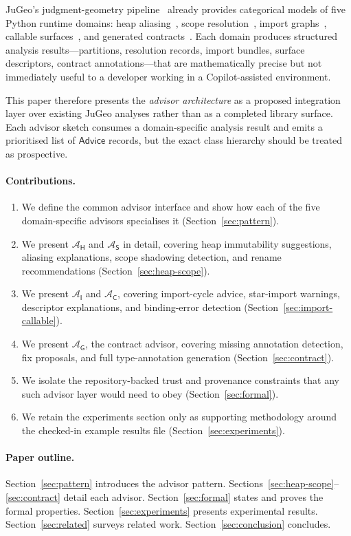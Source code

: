 \documentclass[11pt]{article}
\newcommand{\Adv}{\mathcal{A}}
\newcommand{\AdvH}{\Adv_{\mathsf{H}}}
\newcommand{\AdvS}{\Adv_{\mathsf{S}}}
\newcommand{\AdvI}{\Adv_{\mathsf{I}}}
\newcommand{\AdvC}{\Adv_{\mathsf{C}}}
\newcommand{\AdvG}{\Adv_{\mathsf{G}}}
\newcommand{\Advice}{\mathsf{Advice}}
\begin{document}
JuGeo's judgment-geometry pipeline~\cite{paper00} already provides
categorical models of five Python runtime domains: heap
aliasing~\cite{paper32}, scope resolution~\cite{paper31}, import
graphs~\cite{paper49}, callable surfaces~\cite{paper61}, and generated
contracts~\cite{paper70}.  Each domain produces structured analysis
results—partitions, resolution records, import bundles, surface
descriptors, contract annotations—that are mathematically precise but
not immediately useful to a developer working in a Copilot-assisted
environment.

This paper therefore presents the \emph{advisor architecture} as a
proposed integration layer over existing JuGeo analyses rather than as a
completed library surface.  Each advisor sketch consumes a
domain-specific analysis result and emits a prioritised list of
$\Advice$ records, but the exact class hierarchy should be treated as
prospective.

\paragraph{Contributions.}
\begin{enumerate}
  \item We define the common advisor interface and show how each of
    the five domain-specific advisors specialises it
    (Section~\ref{sec:pattern}).
  \item We present $\AdvH$ and $\AdvS$ in detail, covering heap
    immutability suggestions, aliasing explanations, scope shadowing
    detection, and rename recommendations
    (Section~\ref{sec:heap-scope}).
  \item We present $\AdvI$ and $\AdvC$, covering import-cycle advice,
    star-import warnings, descriptor explanations, and binding-error
    detection (Section~\ref{sec:import-callable}).
  \item We present $\AdvG$, the contract advisor, covering missing
    annotation detection, fix proposals, and full type-annotation
    generation (Section~\ref{sec:contract}).
  \item We isolate the repository-backed trust and provenance constraints
    that any such advisor layer would need to obey
    (Section~\ref{sec:formal}).
  \item We retain the experiments section only as supporting methodology
    around the checked-in example results file
    (Section~\ref{sec:experiments}).
\end{enumerate}

\paragraph{Paper outline.}
Section~\ref{sec:pattern} introduces the advisor pattern.
Sections~\ref{sec:heap-scope}--\ref{sec:contract} detail each advisor.
Section~\ref{sec:formal} states and proves the formal properties.
Section~\ref{sec:experiments} presents experimental results.
Section~\ref{sec:related} surveys related work.
Section~\ref{sec:conclusion} concludes.
\end{document}
